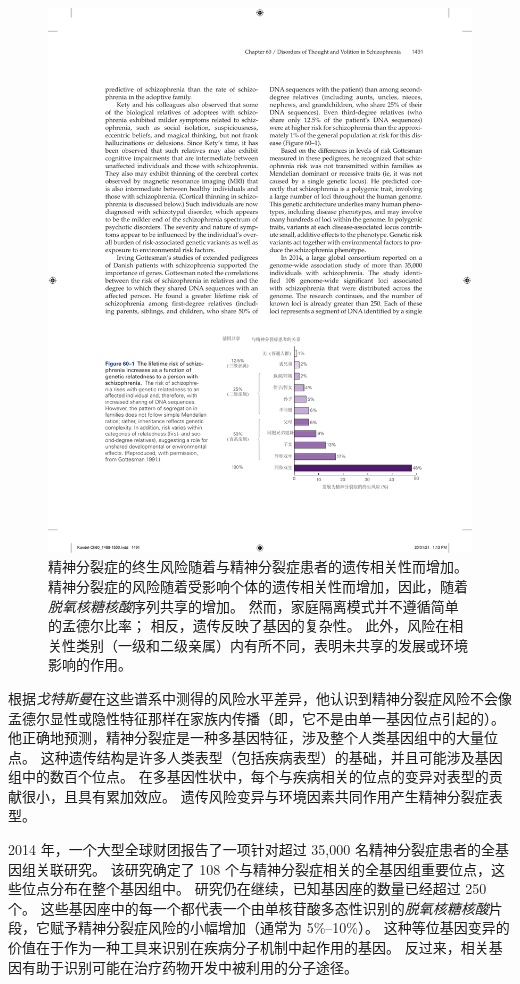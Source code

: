 \begin{figure}[htbp]
	\centering
	\includegraphics[width=0.8\linewidth]{chap60/fig_60_1}
	\caption{精神分裂症的终生风险随着与精神分裂症患者的遗传相关性而增加。
		精神分裂症的风险随着受影响个体的遗传相关性而增加，因此，随着\textit{脱氧核糖核酸}序列共享的增加。
		然而，家庭隔离模式并不遵循简单的孟德尔比率；
		相反，遗传反映了基因的复杂性。
		此外，风险在相关性类别（一级和二级亲属）内有所不同，表明未共享的发展或环境影响的作用\cite{gottesman1991schizophrenia}。}
	\label{fig:60_1}
\end{figure}


根据\textit{戈特斯曼}在这些谱系中测得的风险水平差异，他认识到精神分裂症风险不会像孟德尔显性或隐性特征那样在家族内传播（即，它不是由单一基因位点引起的）。
他正确地预测，精神分裂症是一种多基因特征，涉及整个人类基因组中的大量位点。
这种遗传结构是许多人类表型（包括疾病表型）的基础，并且可能涉及基因组中的数百个位点。
在多基因性状中，每个与疾病相关的位点的变异对表型的贡献很小，且具有累加效应。
遗传风险变异与环境因素共同作用产生精神分裂症表型。


2014 年，一个大型全球财团报告了一项针对超过 35,000 名精神分裂症患者的全基因组关联研究。
该研究确定了 108 个与精神分裂症相关的全基因组重要位点，这些位点分布在整个基因组中。
研究仍在继续，已知基因座的数量已经超过 250 个。
这些基因座中的每一个都代表一个由单核苷酸多态性识别的\textit{脱氧核糖核酸}片段，它赋予精神分裂症风险的小幅增加（通常为 5\%–10\%）。
这种等位基因变异的价值在于作为一种工具来识别在疾病分子机制中起作用的基因。
反过来，相关基因有助于识别可能在治疗药物开发中被利用的分子途径。


